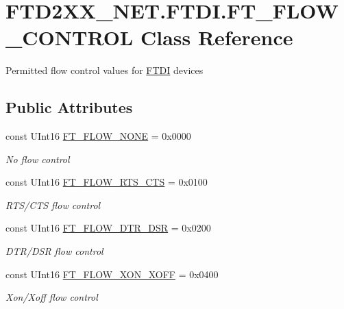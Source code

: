 \hypertarget{class_f_t_d2_x_x___n_e_t_1_1_f_t_d_i_1_1_f_t___f_l_o_w___c_o_n_t_r_o_l}{}\section{F\+T\+D2\+X\+X\+\_\+\+N\+E\+T.\+F\+T\+D\+I.\+F\+T\+\_\+\+F\+L\+O\+W\+\_\+\+C\+O\+N\+T\+R\+OL Class Reference}
\label{class_f_t_d2_x_x___n_e_t_1_1_f_t_d_i_1_1_f_t___f_l_o_w___c_o_n_t_r_o_l}


Permitted flow control values for \mbox{\hyperlink{class_f_t_d2_x_x___n_e_t_1_1_f_t_d_i}{F\+T\+DI}} devices  


\subsection*{Public Attributes}
\begin{DoxyCompactItemize}
\item 
const U\+Int16 \mbox{\hyperlink{class_f_t_d2_x_x___n_e_t_1_1_f_t_d_i_1_1_f_t___f_l_o_w___c_o_n_t_r_o_l_abc22202e190e62ad1bd2d9c6090bd034}{F\+T\+\_\+\+F\+L\+O\+W\+\_\+\+N\+O\+NE}} = 0x0000
\begin{DoxyCompactList}\small\item\em No flow control \end{DoxyCompactList}\item 
const U\+Int16 \mbox{\hyperlink{class_f_t_d2_x_x___n_e_t_1_1_f_t_d_i_1_1_f_t___f_l_o_w___c_o_n_t_r_o_l_a3e78df5b8c264aec584ff13c7f2997bc}{F\+T\+\_\+\+F\+L\+O\+W\+\_\+\+R\+T\+S\+\_\+\+C\+TS}} = 0x0100
\begin{DoxyCompactList}\small\item\em R\+T\+S/\+C\+TS flow control \end{DoxyCompactList}\item 
const U\+Int16 \mbox{\hyperlink{class_f_t_d2_x_x___n_e_t_1_1_f_t_d_i_1_1_f_t___f_l_o_w___c_o_n_t_r_o_l_a06f8bbef4244be5fc3d2379a9d2c1fce}{F\+T\+\_\+\+F\+L\+O\+W\+\_\+\+D\+T\+R\+\_\+\+D\+SR}} = 0x0200
\begin{DoxyCompactList}\small\item\em D\+T\+R/\+D\+SR flow control \end{DoxyCompactList}\item 
const U\+Int16 \mbox{\hyperlink{class_f_t_d2_x_x___n_e_t_1_1_f_t_d_i_1_1_f_t___f_l_o_w___c_o_n_t_r_o_l_a22ce09ab788de488739e3555998e6d87}{F\+T\+\_\+\+F\+L\+O\+W\+\_\+\+X\+O\+N\+\_\+\+X\+O\+FF}} = 0x0400
\begin{DoxyCompactList}\small\item\em Xon/\+Xoff flow control \end{DoxyCompactList}\end{DoxyCompactItemize}


